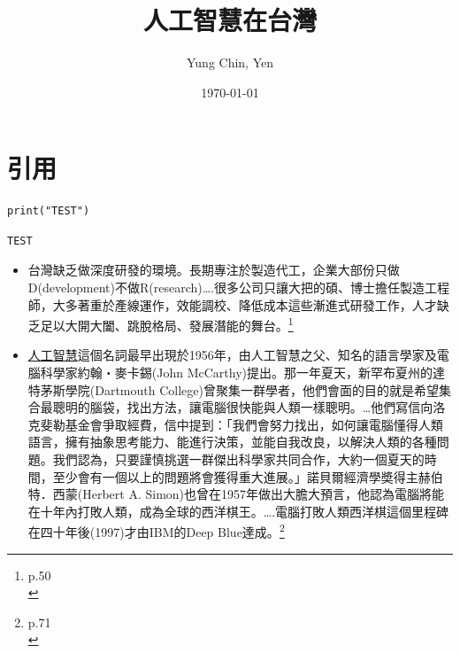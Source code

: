\documentclass[a4paper,12pt]{article}
\author{Yung Chin, Yen}
\date{\today}
\title{人工智慧在台灣}
\begin{document}
\maketitle
\setcounter{tocdepth}{2}
\tableofcontents

\newpage

\section{引用}
\label{sec:orgb79a674}
\lstset{breaklines=true,language=Python,label= ,caption= ,captionpos=b,firstnumber=1,numbers=left}
\begin{lstlisting}
print("TEST")
\end{lstlisting}

\begin{verbatim}
TEST
\end{verbatim}


\begin{itemize}
\item 台灣缺乏做深度研發的環境。長期專注於製造代工，企業大部份只做D(development)不做R(research)\ldots{}.很多公司只讓大把的碩、博士擔任製造工程師，大多著重於產線運作，效能調校、降低成本這些漸進式研發工作，人才缺乏足以大開大闔、跳脫格局、發展潛能的舞台。\footnote{p.50\\}\\
\item \href{20221023101139-人工智慧.org}{人工智慧}這個名詞最早出現於1956年，由人工智慧之父、知名的語言學家及電腦科學家約翰・麥卡錫(John McCarthy)提出。那一年夏天，新罕布夏州的達特茅斯學院(Dartmouth College)曾聚集一群學者，他們會面的目的就是希望集合最聰明的腦袋，找出方法，讓電腦很快能與人類一樣聰明。\ldots{}他們寫信向洛克斐勒基金會爭取經費，信中提到：「我們會努力找出，如何讓電腦懂得人類語言，擁有抽象思考能力、能進行決策，並能自我改良，以解決人類的各種問題。我們認為，只要謹慎挑選一群傑出科學家共同合作，大約一個夏天的時間，至少會有一個以上的問題將會獲得重大進展。」諾貝爾經濟學奬得主赫伯特．西蒙(Herbert A. Simon)也曾在1957年做出大膽大預言，他認為電腦將能在十年內打敗人類，成為全球的西洋棋王。\ldots{}.電腦打敗人類西洋棋這個里程碑在四十年後(1997)才由IBM的Deep Blue達成。\footnote{p.71\\}\\
\end{itemize}
\end{document}
